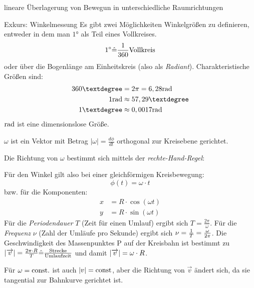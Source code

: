 \documentclass[a4paper,10pt]{scrartcl}
\begin{document}
\begin{seg}{lineare Überlagerung von Bewegun in unterschiedliche Raumrichtungen}
\begin{seg}{Exkurs: Winkelmessung}
Es gibt zwei Möglichkeiten Winkelgrößen zu definieren, entweder in dem man $1$° als Teil eines Vollkreises.
\[
1^\circ \hat = \frac{1}{360} \text{Vollkreis}
\]
oder über die Bogenlänge am Einheitskreis (also als \emph{Radiant}). Charakteristische Größen sind:
\begin{align*}
360°&=2\pi=6,28 \rad\\
1 \rad &\approx 57,29°\\
1°&\approx 0,0017 \rad
\end{align*}
$\text{rad}$ ist eine dimensionslose Größe.
\end{seg}
$\omega$ ist ein Vektor mit Betrag $|\omega|=\frac{d\phi}{dt}$ orthogonal zur Kreisebene gerichtet.
\begin{figure}[h]
\end{figure}
Die Richtung von $\omega$ bestimmt sich mittels der \emph{rechte-Hand-Regel}:
\begin{figure}[h]
\end{figure}
Für den Winkel gilt also bei einer gleichförmigen Kreisbewegung:
\[
\phi(t)=\omega\cdot t
\]
bzw. für die Komponenten:
\begin{align*}
x&=R\cdot \cos(\omega t)\\
y&=R\cdot \sin(\omega t)
\end{align*}
Für die \emph{Periodendauer} $T$ (Zeit für einen Umlauf) ergibt sich $T=\frac{2\pi}{\omega}$. Für die \emph{Frequenz} $\nu$ (Zahl der Umläufe pro Sekunde) ergibt sich $\nu=\frac{1}{T}=\frac{\omega}{2\pi}$. Die Geschwindigkeit des Massenpunktes P auf der Kreisbahn ist bestimmt zu $|\overrightarrow{v}|=\frac{2\pi\cdot R}{T} \hat=\frac{\text{Strecke}}{\text{Umlaufzeit}}$ und damit $|\overrightarrow{v}|=\omega \cdot R$.

Für $\omega=\text{const.}$ ist auch $|v|=\text{const}$, aber die Richtung von $\vec v$ ändert sich, da sie tangential zur Bahnkurve gerichtet ist. 
\end{seg}
\end{document}
